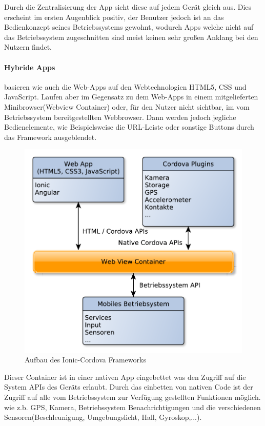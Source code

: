 Durch die Zentralisierung der App sieht diese auf jedem Gerät gleich aus. Dies erscheint im ersten Augenblick positiv, der Benutzer jedoch ist an das Bedienkonzept seines Betriebssystems gewohnt, wodurch Apps welche nicht auf das Betriebssystem zugeschnitten sind meist keinen sehr großen Anklang bei den Nutzern findet. 

\paragraph{Hybride Apps}\label{Hybride Apps} basieren wie auch die Web-Apps auf den Webtechnologien HTML5, CSS und JavaScript. Laufen aber im Gegensatz zu dem Web-Apps in einem mitgelieferten Minibrowser(Webview Container) oder, für den Nutzer nicht sichtbar, im vom Betriebssystem bereitgestellten Webbrowser. Dann werden jedoch jegliche Bedienelemente, wie Beispielsweise die URL-Leiste oder sonstige Buttons durch das Framework ausgeblendet.

\begin{figure}[H]
	\centering
	\includegraphics[scale=0.8]{images/IonicCordova}
	\caption[Aufbau des Ionic-Cordova Frameworks]{Aufbau des Ionic-Cordova Frameworks}
	\label{IonicCordova}
\end{figure}

Dieser Container ist in einer nativen App eingebettet was den Zugriff auf die System APIs des Geräts erlaubt. Durch das einbetten von nativen Code ist der Zugriff auf alle vom Betriebssystem zur Verfügung gestellten Funktionen möglich. wie z.b. GPS, Kamera, Betriebssystem Benachrichtigungen und die verschiedenen Sensoren(Beschleunigung, Umgebungslicht, Hall, Gyroskop,...). 

